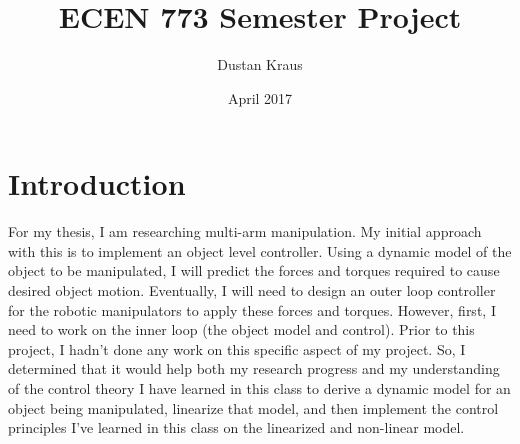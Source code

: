 \documentclass{article}
\title{ECEN 773 Semester Project}
\author{Dustan Kraus}
\date{April 2017}
\begin{document}
\maketitle

\section{Introduction}
For my thesis, I am researching multi-arm manipulation. My initial approach with this is to implement an object level controller. Using a dynamic model of the object to be manipulated, I will predict the forces and torques required to cause desired object motion. Eventually, I will need to design an outer loop controller for the robotic manipulators to apply these forces and torques. However, first, I need to work on the inner loop (the object model and control). Prior to this project, I hadn't done any work on this specific aspect of my project. So, I determined that it would help both my research progress and my understanding of the control theory I have learned in this class to derive a dynamic model for an object being manipulated, linearize that model, and then implement the control principles I've learned in this class on the linearized and non-linear model.
\end{document}
